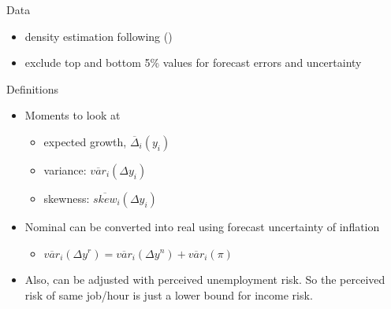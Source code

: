 \documentclass{beamer}
\begin{document}
\begin{frame}{Data}
	\begin{table}
		\centering
		\caption{Survey of Consumer Expectations}
		\label{SCE_data_sum}
	\end{table}
	\begin{itemize}
		\item density estimation following (\cite{engelberg_comparing_2009})
		\item exclude top and bottom 5\% values for forecast errors and uncertainty
	\end{itemize}
\end{frame}


\begin{frame}{Definitions}
	\begin{itemize}
		\item Moments to look at 
		\begin{itemize}
			\item expected growth, $\overline \Delta_i (y_i)$
			\item variance: $\overline {var}_i(\Delta y_i)$
			\item skewness: $\overline {skew}_i(\Delta y_i)$
		\end{itemize}
		\item Nominal can be converted into real using forecast uncertainty of inflation 
		\begin{itemize}
			\item $\overline{var}_i(\Delta y^r) =\overline {var}_i(\Delta y^n) +  \overline {var}_i(\pi)$
		\end{itemize}
		\item Also, can be adjusted with perceived unemployment risk. So the perceived risk of same job/hour is just a lower bound for income risk. 
	\end{itemize}
\end{frame}
\end{document}
